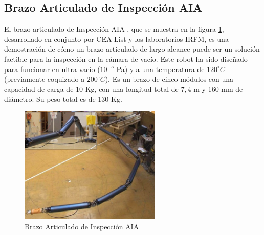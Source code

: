 %
%

\subsection*{Brazo Articulado de Inspección AIA}		\label{robotAIA:sub}
El brazo articulado de Inspección AIA \cite{Gargiulo2008,Keller2009,Gargiulo2009, Houry2010}, que se muestra en la figura \ref{fig:AIA}, desarrollado en conjunto por CEA List y los laboratorios IRFM, es una demostración de cómo un brazo articulado de largo alcance puede ser un solución factible para la inspección en la cámara de vacío. Este robot ha sido diseñado para funcionar en ultra-vacío ($10^{-5}$ Pa) y a una temperatura de $120^{\circ}C$ (previamente coquizado a $200^{\circ}C$). Es un brazo de cinco módulos con una capacidad de carga de 10 Kg, con una longitud total de $7,4$ m y 160 mm de diámetro. Su peso total es de 130 Kg.

\begin{figure}[htbp]
   \centering
   \includegraphics[width=0.6\textwidth]{FiguresSoA/AIA}
   \caption{Brazo Articulado de Inspección AIA}
   \label{fig:AIA} 
\end{figure}

